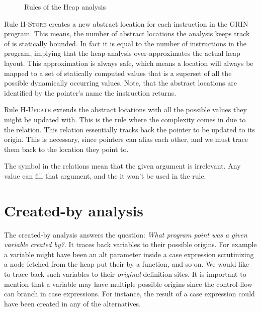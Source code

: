 \documentclass[main.tex]{subfiles}
\begin{document}
  \begin{figure}[h]

  \caption{Rules of the Heap analysis}
  \label{fig:heap-analysis}
  \end{figure}

  Rule \textsc{H-Store} creates a new abstract location for each  instruction in the GRIN program. This means, the number of abstract locations the analysis keeps track of is statically bounded. In fact it is equal to the number of  instructions in the program, implying that the heap analysis over-approximates the actual heap layout. This approximation is always safe, which means a location will always be mapped to a set of statically computed values that is a superset of all the possible dynamically occurring values. Note, that the abstract locations are identified by the pointer's name the  instruction returns.

	Rule \textsc{H-Update} extends the abstract locations with all the possible values they might be updated with. This is the rule where the complexity comes in due to the  relation. This relation essentially tracks back the pointer to be updated to its origin. This is necessary, since pointers can alias each other, and we must trace them back to the location they point to.
	
	The \any symbol in the relations mean that the given argument is irrelevant. Any value can fill that argument, and the it won't be used in the rule.

  \section{Created-by analysis} \label{sec:created-by}
  
  The created-by analysis answers the question: \emph{What program point was a given variable created by?}. It traces back variables to their possible origins. 
  For example a variable might have been an alt parameter inside a case expression scrutinizing a node fetched from the heap put their by a function, and so on. We would like to trace back such variables to their \emph{original} definition sites. It is important to mention that a variable may have multiple possible origins since the control-flow can branch in case expressions. For instance, the result of a case expression could have been created in any of the alternatives.
  
\end{document}
